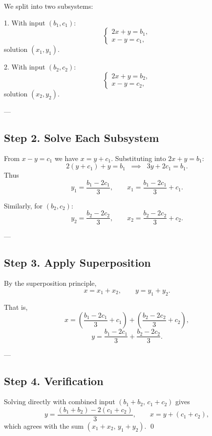 \documentclass[12pt]{article}
\begin{document}
	We split into two subsystems:
	
	1. With input $(b_1, c_1)$:
	$$
	\begin{cases}
		2x + y = b_1, \\
		x - y = c_1,
	\end{cases}
	$$
	solution $(x_1, y_1)$.
	
	2. With input $(b_2, c_2)$:
	$$
	\begin{cases}
		2x + y = b_2, \\
		x - y = c_2,
	\end{cases}
	$$
	solution $(x_2, y_2)$.
	
	---
	
	\subsection*{Step 2. Solve Each Subsystem}
	
	From $x - y = c_1$ we have $x = y + c_1$. Substituting into $2x + y = b_1$:
	$$
	2(y+c_1) + y = b_1 \;\;\implies\;\; 3y + 2c_1 = b_1.
	$$
	Thus
	$$
	y_1 = \frac{b_1 - 2c_1}{3}, 
	\qquad
	x_1 = \frac{b_1 - 2c_1}{3} + c_1.
	$$
	
	Similarly, for $(b_2, c_2)$:
	$$
	y_2 = \frac{b_2 - 2c_2}{3}, 
	\qquad
	x_2 = \frac{b_2 - 2c_2}{3} + c_2.
	$$
	
	---
	
	\subsection*{Step 3. Apply Superposition}
	
	By the superposition principle,
	$$
	x = x_1 + x_2, 
	\qquad 
	y = y_1 + y_2.
	$$
	
	That is,
	$$
	x = \left(\frac{b_1 - 2c_1}{3} + c_1\right) 
	+ \left(\frac{b_2 - 2c_2}{3} + c_2\right),
	$$
	$$
	y = \frac{b_1 - 2c_1}{3} + \frac{b_2 - 2c_2}{3}.
	$$
	
	---
	
	\subsection*{Step 4. Verification}
	
	Solving directly with combined input $(b_1+b_2,\,c_1+c_2)$ gives
	$$
	y = \frac{(b_1+b_2) - 2(c_1+c_2)}{3}, 
	\qquad
	x = y + (c_1+c_2),
	$$
	which agrees with the sum $(x_1+x_2,\, y_1+y_2)$. \qed
	 
	
\end{document}
